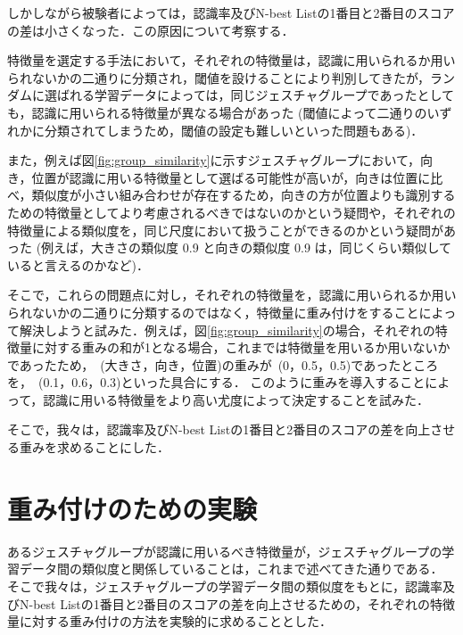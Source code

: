 しかしながら被験者によっては，認識率及びN-best Listの1番目と2番目のスコアの差は小さくなった．この原因について考察する．

特徴量を選定する手法において，それぞれの特徴量は，認識に用いられるか用いられないかの二通りに分類され，閾値を設けることにより判別してきたが，ランダムに選ばれる学習データによっては，同じジェスチャグループであったとしても，認識に用いられる特徴量が異なる場合があった (閾値によって二通りのいずれかに分類されてしまうため，閾値の設定も難しいといった問題もある)．

また，例えば図\ref{fig:group_similarity}に示すジェスチャグループにおいて，向き，位置が認識に用いる特徴量として選ばる可能性が高いが，向きは位置に比べ，類似度が小さい組み合わせが存在するため，向きの方が位置よりも識別するための特徴量としてより考慮されるべきではないのかという疑問や，それぞれの特徴量による類似度を，同じ尺度において扱うことができるのかという疑問があった (例えば，大きさの類似度 0.9 と向きの類似度 0.9 は，同じくらい類似していると言えるのかなど)．

そこで，これらの問題点に対し，それぞれの特徴量を，認識に用いられるか用いられないかの二通りに分類するのではなく，特徴量に重み付けをすることによって解決しようと試みた．例えば，図\ref{fig:group_similarity}の場合，それぞれの特徴量に対する重みの和が1となる場合，これまでは特徴量を用いるか用いないかであったため，~(大きさ，向き，位置)の重みが~(0，0.5，0.5)であったところを，~(0.1，0.6，0.3)といった具合にする．
このように重みを導入することによって，認識に用いる特徴量をより高い尤度によって決定することを試みた．

そこで，我々は，認識率及びN-best Listの1番目と2番目のスコアの差を向上させる重みを求めることにした．


\section{重み付けのための実験}
あるジェスチャグループが認識に用いるべき特徴量が，ジェスチャグループの学習データ間の類似度と関係していることは，これまで述べてきた通りである．
そこで我々は，ジェスチャグループの学習データ間の類似度をもとに，認識率及びN-best Listの1番目と2番目のスコアの差を向上させるための，それぞれの特徴量に対する重み付けの方法を実験的に求めることとした．

